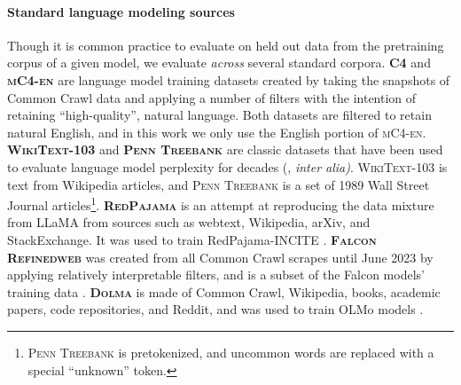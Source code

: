 \paragraph{Standard language modeling sources} Though it is common practice to evaluate on held out data from the pretraining corpus of a given model, we evaluate \textit{across} several standard corpora. \textbf{\textsc{C4}} \citep{Raffel2019ExploringTL, dodge-etal-2021-documenting} and \textbf{\textsc{mC4-en}} \citep{Chung2023UniMaxFA} are language model training datasets created by taking the snapshots of Common Crawl data and applying a number of filters with the intention of retaining ``high-quality'', natural language. Both datasets are filtered to retain natural English, and in this work we only use the English portion of \textsc{mC4-en}.
\textbf{\textsc{WikiText-103}} \citep{Merity2016PointerSM} and \textbf{\textsc{Penn Treebank}} \citep{MarcusPTB} are classic datasets that have been used to evaluate language model perplexity for decades (\citealp{Radford2019LanguageMA, brown2020language, Rae2021ScalingLM,Hoffmann2022TrainingCL}, \textit{inter alia)}. \textsc{WikiText-103} is text from Wikipedia articles, and \textsc{Penn Treebank} \citep{MarcusPTB} is a set of 1989 Wall Street Journal articles\footnote{\textsc{Penn Treebank} is pretokenized, and uncommon words are replaced with a special ``unknown'' token.}.
\textbf{\textsc{RedPajama}} \citep{together2023redpajama} is an attempt at reproducing the data mixture from LLaMA \citep{llama} from sources such as webtext, Wikipedia, arXiv, and StackExchange. It was used to train RedPajama-INCITE \citep{together2023redpajama}.
\textbf{\textsc{Falcon Refinedweb}} \citet{Penedo2023TheRD} was created from all Common Crawl scrapes until June 2023  by applying relatively interpretable filters, and is a subset of the Falcon models' training data \citep{falcon}.
\textbf{\textsc{Dolma}} \citet{dolma} is made of Common Crawl, Wikipedia, books, academic papers, code repositories, and Reddit, and was used to train OLMo models \citep{Groeneveld2024OLMoAT}.

